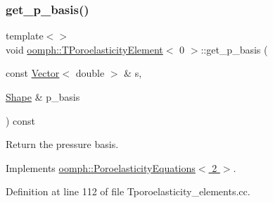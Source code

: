 \mbox{\label{classoomph_1_1TPoroelasticityElement_ae5879c618bbfd76e4c720e2d77b39e19}} 
\subsubsection{\texorpdfstring{get\+\_\+p\+\_\+basis()}{get\_p\_basis()}\hspace{0.1cm}{\footnotesize\ttfamily [1/3]}}
{\footnotesize\ttfamily template$<$$>$ \\
void \hyperlink{classoomph_1_1TPoroelasticityElement}{oomph\+::\+T\+Poroelasticity\+Element}$<$ 0 $>$\+::get\+\_\+p\+\_\+basis (\begin{DoxyParamCaption}\item[{const \hyperlink{classoomph_1_1Vector}{Vector}$<$ double $>$ \&}]{s,  }\item[{\hyperlink{classoomph_1_1Shape}{Shape} \&}]{p\+\_\+basis }\end{DoxyParamCaption}) const\hspace{0.3cm}{\ttfamily [virtual]}}



Return the pressure basis. 



Implements \hyperlink{classoomph_1_1PoroelasticityEquations_af5dd9aa31ee8da161285e7ed6b7cb8fc}{oomph\+::\+Poroelasticity\+Equations$<$ 2 $>$}.



Definition at line 112 of file Tporoelasticity\+\_\+elements.\+cc.

\mbox{\label{classoomph_1_1TPoroelasticityElement_a331ed84e73c867f6755dcc2f50a167ce}} 
